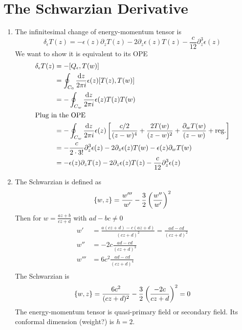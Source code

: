 \section{The Schwarzian Derivative}
\begin{enumerate}[label=(\alph*)]
	\item The infinitesimal change of energy-momentum tensor is
		\begin{equation}
			\delta_\epsilon T(z) = - \epsilon(z) \partial_z T(z) - 2 \partial_z \epsilon(z) T(z) -\frac{c}{12} \partial_z^3 \epsilon(z)
		\end{equation}
		We want to show it is equivalent to its OPE
		\begin{align*}
			\delta_\epsilon T(z) &= -\comm{Q_\epsilon}{T(w)} \\
										&=\oint_{C_0} \frac{\dd{z}}{2\pi i } \epsilon(z) \comm{T(z)}{T(w)} \\
										&=- \oint_{C_w} \frac{\dd{z}}{2\pi i } \epsilon(z) T(z) T(w) \\
										\shortintertext{Plug in the OPE}
										&= -\oint_{C_w} \frac{\dd{z}}{2\pi i } \epsilon(z) \left[ \frac{c/2}{(z-w)^4} + \frac{2T(w)}{(z-w)^2} + \frac{\partial_w T(w)}{(z-w)} + \text{reg.} \right] \\
										&= -\frac{c}{2\cdot 3!}\partial_z^3 \epsilon(z) - 2 \partial_z \epsilon(z) T(w) - \epsilon(z)\partial_w T(w) \\
										&= - \epsilon(z) \partial_z T(z) - 2 \partial_z \epsilon(z) T(z) -\frac{c}{12} \partial_z^3 \epsilon(z)
		\end{align*}

	\item The Schwarzian is defined as
		\begin{equation}
			\acomm{w}{z} = \frac{w'''}{w'} - \frac{3}{2} \left( \frac{w''}{w'} \right) ^2
		\end{equation}
		Then for $w = \frac{az+b}{cz+d}$ with $ad-bc \neq 0$
		\begin{align*}
			w' &= \frac{a(cz+d) - c (az+d)}{(cz+d)^2} = \frac{ad-cd}{(cz+d)^2} \\
			w'' &= -2c \frac{ad-cd}{(cz+d)^3} \\
			w''' &= 6c^2 \frac{ad-cd}{(cz+d)^4} \\
		\end{align*}
		The Schwarzian is
		\begin{equation*}
			\acomm{w}{z} = \frac{6c^2}{(cz+d)^2} - \frac{3}{2} \left( \frac{-2c}{cz+d} \right)^2 = 0
		\end{equation*}
		The energy-momentum tensor is quasi-primary field or secondary field. Its conformal dimension (weight?) is $h=2$.


\end{enumerate}
